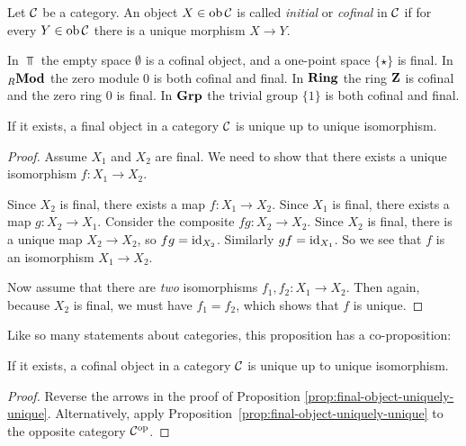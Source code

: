 \begin{definition}
Let ${\mathcal{C}}$ be a category. An object $X\in \operatorname{ob} {\mathcal{C}}$ is called \emph{initial} or \emph{cofinal} in ${\mathcal{C}}$ if for every $Y\in \operatorname{ob}{\mathcal{C}}$ there is a 
unique morphism $X\to Y$.
\end{definition}

\begin{examples}
In $\Top$ the empty space $\emptyset$ is a cofinal object, and a one-point space $\{\star\}$ is final. In ${}_R\mathbf{Mod}$ the zero module $0$ is both cofinal and final. In $\mathbf{Ring}$ the ring ${\mathbf{Z}}$ is cofinal and the zero ring $0$ is final. In $\mathbf{Grp}$ the trivial group $\{1\}$ is both cofinal and final.
\end{examples}

\begin{proposition}\label{prop:final-object-uniquely-unique}
If it exists, a final object in a category ${\mathcal{C}}$ is unique up to unique isomorphism.
\end{proposition}

\begin{proof}
Assume $X_1$ and $X_2$ are final. We need to show that there exists a unique isomorphism $f\colon X_1\to X_2$.

Since $X_2$ is final, there exists a map $f\colon X_1\to X_2$. Since $X_1$ is final, there exists a map $g\colon X_2\to X_1$. Consider the composite $fg\colon X_2 \to X_2$. Since $X_2$ is final, there is a unique map $X_2\to X_2$, so $fg={\rm id}_{X_2}$. Similarly $gf={\rm id}_{X_1}$. So we see that $f$ is an isomorphism $X_1\to X_2$.

Now assume that there are \emph{two} isomorphisms $f_1,f_2\colon X_1 \to X_2$. Then again, because $X_2$ is final, we must have $f_1=f_2$, which shows that $f$ is unique. 
\end{proof}

Like so many statements about categories, this proposition has a co-proposition:

\begin{proposition}
If it exists, a cofinal object in a category ${\mathcal{C}}$ is unique up to unique isomorphism.
\end{proposition}

\begin{proof}Reverse the arrows in the proof of Proposition \ref{prop:final-object-uniquely-unique}. Alternatively, apply 
Proposition~\ref{prop:final-object-uniquely-unique} to the opposite category ${\mathcal{C}}^{\mathrm{op}}$.
\end{proof}

